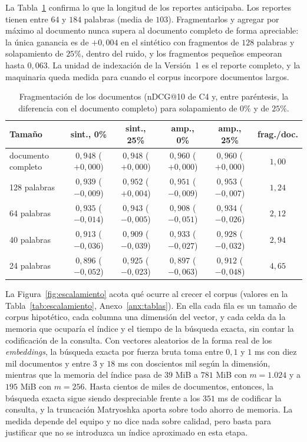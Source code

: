 \documentclass[11pt,letterpaper]{article}
\numberwithin{equation}{section}
\begin{document}
La Tabla~\ref{tab:chunking} confirma lo que la longitud de los reportes anticipaba. Los reportes tienen entre $64$ y $184$ palabras (media de $103$). Fragmentarlos y agregar por máximo al documento nunca supera al documento completo de forma apreciable: la única ganancia es de $+0{,}004$ en el sintético con fragmentos de $128$ palabras y solapamiento de $25\%$, dentro del ruido, y los fragmentos pequeños empeoran hasta $0{,}063$. La unidad de indexación de la Versión~1 es el reporte completo, y la maquinaria queda medida para cuando el corpus incorpore documentos largos.

\begin{table}[htbp]
\centering
\footnotesize
\setlength{\tabcolsep}{5pt}
\renewcommand{\arraystretch}{1.25}
\caption{Fragmentación de los documentos (nDCG@10 de C4 y, entre paréntesis, la diferencia con el documento completo) para solapamiento de $0\%$ y de $25\%$.}
\label{tab:chunking}
\begin{tabularx}{\textwidth}{@{}l c c c c c@{}}
\toprule
\textbf{Tamaño} & \textbf{sint., 0\%} & \textbf{sint., 25\%} & \textbf{amp., 0\%} & \textbf{amp., 25\%} & \textbf{frag./doc.} \\
\midrule
documento completo & $0{,}948$ ($+0{,}000$) & $0{,}948$ ($+0{,}000$) & $0{,}960$ ($+0{,}000$) & $0{,}960$ ($+0{,}000$) & $1{,}00$ \\
128 palabras & $0{,}939$ ($-0{,}009$) & $0{,}952$ ($+0{,}004$) & $0{,}951$ ($-0{,}009$) & $0{,}953$ ($-0{,}007$) & $1{,}24$ \\
64 palabras & $0{,}935$ ($-0{,}014$) & $0{,}943$ ($-0{,}005$) & $0{,}908$ ($-0{,}051$) & $0{,}934$ ($-0{,}026$) & $2{,}12$ \\
40 palabras & $0{,}913$ ($-0{,}036$) & $0{,}909$ ($-0{,}039$) & $0{,}933$ ($-0{,}027$) & $0{,}928$ ($-0{,}032$) & $2{,}94$ \\
24 palabras & $0{,}896$ ($-0{,}052$) & $0{,}925$ ($-0{,}023$) & $0{,}897$ ($-0{,}063$) & $0{,}912$ ($-0{,}048$) & $4{,}65$ \\
\bottomrule
\end{tabularx}
\end{table}

La Figura~\ref{fig:escalamiento} acota qué ocurre al crecer el corpus (valores en la Tabla~\ref{tab:escalamiento}, Anexo~\ref{anx:tablas}). En ella cada fila es un tamaño de corpus hipotético, cada columna una dimensión del vector, y cada celda da la memoria que ocuparía el índice y el tiempo de la búsqueda exacta, sin contar la codificación de la consulta. Con vectores aleatorios de la forma real de los \textit{embeddings}, la búsqueda exacta por fuerza bruta toma entre $0{,}1$ y $1$ ms con diez mil documentos y entre $3$ y $18$ ms con doscientos mil según la dimensión, mientras que la memoria del índice pasa de $39$ MiB a $781$ MiB con $m=1.024$ y a $195$ MiB con $m=256$. Hasta cientos de miles de documentos, entonces, la búsqueda exacta sigue siendo despreciable frente a los $351$ ms de codificar la consulta, y la truncación Matryoshka aporta sobre todo ahorro de memoria. La medida depende del equipo y no dice nada sobre calidad, pero basta para justificar que no se introduzca un índice aproximado en esta etapa.
\end{document}
